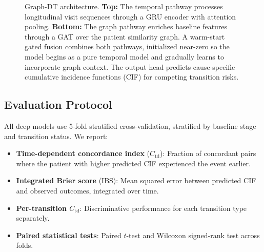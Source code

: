 \begin{figure}[!t]
{
}
\caption{Graph-DT architecture. \textbf{Top:} The temporal pathway processes longitudinal visit sequences through a GRU encoder with attention pooling. \textbf{Bottom:} The graph pathway enriches baseline features through a GAT over the patient similarity graph. A warm-start gated fusion combines both pathways, initialized near-zero so the model begins as a pure temporal model and gradually learns to incorporate graph context. The output head predicts cause-specific cumulative incidence functions (CIF) for competing transition risks.}
\label{p3:fig:architecture}
\end{figure}

\subsection{Evaluation Protocol}
\label{p3:sec:evaluation}

All deep models use 5-fold stratified cross-validation, stratified by baseline stage and transition status. We report:
\begin{itemize}
    \item \textbf{Time-dependent concordance index} ($C_\text{td}$): Fraction of concordant pairs where the patient with higher predicted CIF experienced the event earlier.
    \item \textbf{Integrated Brier score} (IBS): Mean squared error between predicted CIF and observed outcomes, integrated over time.
    \item \textbf{Per-transition $C_\text{td}$}: Discriminative performance for each transition type separately.
    \item \textbf{Paired statistical tests}: Paired $t$-test and Wilcoxon signed-rank test across folds.
\end{itemize}

